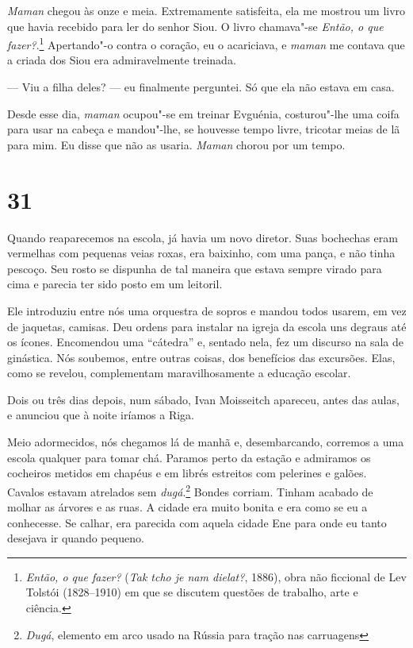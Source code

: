 \emph{Maman} chegou às onze e meia. Extremamente satisfeita, ela me
mostrou um livro que havia recebido para ler do senhor Siou. O livro
chamava"-se \emph{Então, o que fazer?}.\footnote{\emph{Então, o que
  fazer?} (\emph{Tak tcho je nam dielat?}, 1886), obra não
  ficcional de Lev Tolstói (1828--1910) em que se discutem questões de
  trabalho, arte e ciência.} Apertando"-o contra o coração, eu o
acariciava, e \emph{maman} me contava que a criada dos Siou era
admiravelmente treinada.

--- Viu a filha deles? --- eu finalmente perguntei. Só que ela não
estava em casa.

Desde esse dia, \emph{maman} ocupou"-se em treinar Evguénia, costurou"-lhe
uma coifa para usar na cabeça e mandou"-lhe, se houvesse tempo livre,
tricotar meias de lã para mim. Eu disse que não as usaria. \emph{Maman}
chorou por um tempo.

\section{31}

Quando reaparecemos na escola, já havia um novo diretor. Suas bochechas
eram vermelhas com pequenas veias roxas, era baixinho, com uma pança, e
não tinha pescoço. Seu rosto se dispunha de tal maneira que estava
sempre virado para cima e parecia ter sido posto em um leitoril.

Ele introduziu entre nós uma orquestra de sopros e mandou todos usarem,
em vez de jaquetas, camisas. Deu ordens para instalar na igreja da
escola uns degraus até os ícones. Encomendou uma ``cátedra'' e, sentado
nela, fez um discurso na sala de ginástica. Nós soubemos, entre outras
coisas, dos benefícios das excursões. Elas, como se revelou,
complementam maravilhosamente a educação escolar.

Dois ou três dias depois, num sábado, Ivan Moisseitch apareceu, antes
das aulas, e anunciou que à noite iríamos a Riga.

Meio adormecidos, nós chegamos lá de manhã e, desembarcando, corremos a
uma escola qualquer para tomar chá. Paramos perto da estação e admiramos
os cocheiros metidos em chapéus e em librés estreitos com pelerines e
galões. Cavalos estavam atrelados sem \emph{dugá}.\footnote{\emph{Dugá},
  elemento em arco usado na Rússia para tração nas carruagens} Bondes
corriam. Tinham acabado de molhar as árvores e as ruas. A cidade era
muito bonita e era como se eu a conhecesse. Se calhar, era parecida com
aquela cidade Ene para onde eu tanto desejava ir quando pequeno.

